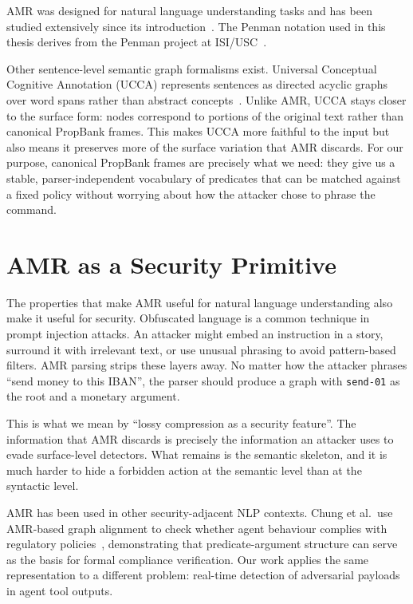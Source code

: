 AMR was designed for natural language understanding tasks and has been studied
extensively since its introduction~\cite{banarescu2013abstract,knight2021abstract}.
The Penman notation used in this thesis derives from the Penman project at
ISI/USC~\cite{matthiessen1991text}.

Other sentence-level semantic graph formalisms exist.
Universal Conceptual Cognitive Annotation (UCCA) represents sentences as
directed acyclic graphs over word spans rather than abstract
concepts~\cite{abend2013ucca}.
Unlike AMR, UCCA stays closer to the surface form: nodes correspond to
portions of the original text rather than canonical PropBank frames.
This makes UCCA more faithful to the input but also means it preserves
more of the surface variation that AMR discards.
For our purpose, canonical PropBank frames are precisely what we need:
they give us a stable, parser-independent vocabulary of predicates that
can be matched against a fixed policy without worrying about how the
attacker chose to phrase the command.

\section{AMR as a Security Primitive}
\label{sec:bg-security}

The properties that make AMR useful for natural language understanding also make it
useful for security.
Obfuscated language is a common technique in prompt injection attacks.
An attacker might embed an instruction in a story, surround it with irrelevant text,
or use unusual phrasing to avoid pattern-based filters.
AMR parsing strips these layers away.
No matter how the attacker phrases ``send money to this IBAN'', the parser should
produce a graph with \texttt{send-01} as the root and a monetary argument.

This is what we mean by ``lossy compression as a security feature''.
The information that AMR discards is precisely the information an attacker uses to
evade surface-level detectors.
What remains is the semantic skeleton, and it is much harder to hide a forbidden action
at the semantic level than at the syntactic level.

AMR has been used in other security-adjacent NLP contexts.
Chung et al.\ use AMR-based graph alignment to check whether agent behaviour complies
with regulatory policies~\cite{chung2025graphcompliance}, demonstrating that
predicate-argument structure can serve as the basis for formal compliance verification.
Our work applies the same representation to a different problem: real-time detection of
adversarial payloads in agent tool outputs.

